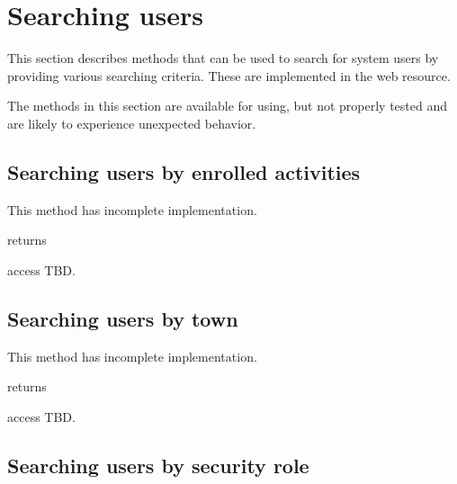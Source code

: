 \section{Searching users}
\label{sec:call:user_search}

This section describes methods that can be used to search for system users by
providing various searching criteria. These are implemented in the
 web resource.

The methods in this section are available for using, but not properly tested and
are likely to experience unexpected behavior.

\subsection{Searching users by enrolled activities}

This method has incomplete implementation.

\begin{apidata}{returns}
  \begin{datalist}
  \end{datalist}
\end{apidata}
\begin{apidata}{access}
  TBD.
\end{apidata}

\subsection{Searching users by town}

This method has incomplete implementation.

\begin{apidata}{returns}
  \begin{datalist}
  \end{datalist}
\end{apidata}
\begin{apidata}{access}
  TBD.
\end{apidata}

\subsection{Searching users by security role}

